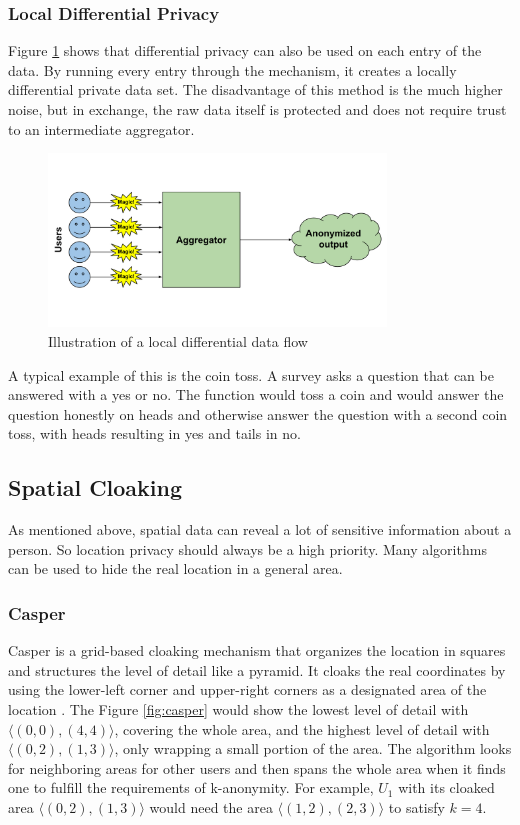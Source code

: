 \subsubsection{Local Differential Privacy}
Figure \ref{fig:local_diff} shows that differential privacy can also be used on each entry of the data. By running every entry through the mechanism, it creates a locally differential private data set. The disadvantage of this method is the much higher noise, but in exchange, the raw data itself is protected and does not require trust to an intermediate aggregator.

\begin{figure}[htpb]
  \centering
  \includegraphics[width=0.8\textwidth]{figures/local_diff.png}
  \caption{Illustration of a local differential data flow \cite{desfontaines}} 
  \label{fig:local_diff}
\end{figure}

A typical example of this is the coin toss. A survey asks a question that can be answered with a yes or no. The function would toss a coin and would answer the question honestly on heads and otherwise answer the question with a second coin toss, with heads resulting in yes and tails in no. 

\subsection{Spatial Cloaking}
As mentioned above, spatial data can reveal a lot of sensitive information about a person. So location privacy should always be a high priority. Many algorithms can be used to hide the real location in a general area.

\subsubsection{Casper}
Casper \cite{DBLP:journals/tods/ChowMA09} is a grid-based cloaking mechanism that organizes the location in squares and structures the level of detail like a pyramid. It cloaks the real coordinates by using the lower-left corner and upper-right corners as a designated area of the location \cite{DBLP:conf/ssd/TanLM09}. The Figure \ref{fig:casper} would show the lowest level of detail with \(\langle(0,0),(4,4)\rangle\), covering the whole area, and the highest level of detail with \(\langle(0,2),(1,3)\rangle\), only wrapping a small portion of the area. The algorithm looks for neighboring areas for other users and then spans the whole area when it finds one to fulfill the requirements of k-anonymity. For example, \(U_1\) with its cloaked area \(\langle(0,2),(1,3)\rangle\) would need the area \(\langle(1,2),(2,3)\rangle\) to satisfy \(k=4\).

